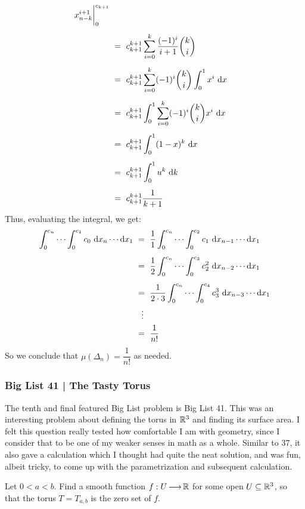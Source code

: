 \begin{soln}
\begin{align*}
        x_{n-k}^{i+1}\bigg\rvert_{0}^{c_{k+1}} \vsp
        & \ = \ c_{k+1}^{k+1}\sum_{i=0}^{k}\frac{(-1)^{i}}{i+1}\binom k i \vsp
        & \ = \ c_{k+1}^{k+1}\sum_{i=0}^{k}(-1)^{i}\binom k i \int_{0}^{1}x^{i}\
        \d x \vsp
        & \ = \ c_{k+1}^{k+1}\int_{0}^{1}\sum_{i=0}^{k}(-1)^{i}\binom k ix^{i}\
        \d x \vsp
        & \ = \ c_{k+1}^{k+1}\int_{0}^{1}(1-x)^{k}\ \d x \vsp
        & \ = \ c_{k+1}^{k+1}\int_{0}^{1}u^{k}\ \d k \vsp
        & \ = \ c_{k+1}^{k+1}\frac{1}{k+1}
    \end{align*}
    Thus, evaluating the integral, we get:
    \begin{align*}
        \int_{0}^{c_{n}}\cdots \int_{0}^{c_{1}}
        c_{0}\ \d x_{n}\cdots \d x_{1} & \ = \ \frac{1}{1}
        \int_{0}^{c_{n}}\cdots \int_{0}^{c_{2}}
        c_{1}\ \d x_{n-1}\cdots \d x_{1} \vsp
        & \ = \ \frac{1}{2} \int_{0}^{c_{n}}\cdots \int_{0}^{c_{3}}
        c_{2}^{2}\ \d x_{n-2}\cdots \d x_{1} \vsp
        & \ = \ \frac{1}{2\cdot3} \int_{0}^{c_{n}}\cdots \int_{0}^{c_{4}}
        c_{3}^{3}\ \d x_{n-3}\cdots \d x_{1} \\
        & \ \ \ \vdots \\
        & \ = \ \frac{1}{n!}
    \end{align*}
    So we conclude that $ \mu(\Delta_{n}) = \dfrac{1}{n!} $ as needed.
\end{soln}

\newpage
\subsubsection{Big List 41 | The Tasty Torus}

The tenth and final featured Big List problem is Big List 41. This was an
interesting problem about defining the torus in $ \mathbb{R}^{3} $ and finding its
surface area. I felt this question really tested how comfortable I am with
geometry, since I consider that to be one of my weaker senses in math as a
whole. Similar to 37, it also gave a calculation which I thought had quite the
neat solution, and was fun, albeit tricky, to come up with the parametrization
and subsequent calculation.

\begin{qu}[num=41.1]
    Let $ 0 < a < b $. Find a smooth function $ f:U \operatorname{\longrightarrow} \mathbb{R} $ for some open
    $ U \subseteq \mathbb{R}^{3} $, so that the torus $ T = T_{a,b} $ is the zero set
    of $ f $.
\end{qu}

